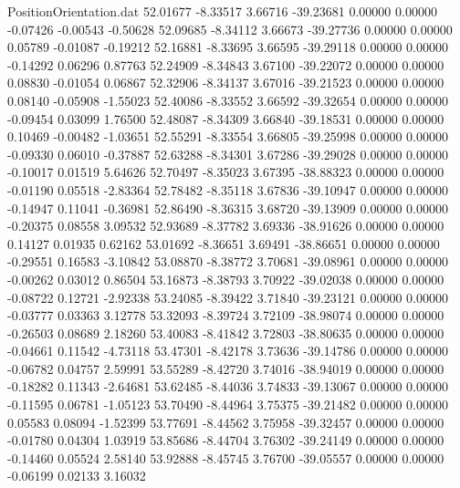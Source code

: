 \begin{filecontents}{PositionOrientation.dat}
  52.01677   -8.33517    3.66716   -39.23681    0.00000    0.00000   -0.07426   -0.00543   -0.50628
  52.09685   -8.34112    3.66673   -39.27736    0.00000    0.00000    0.05789   -0.01087   -0.19212
  52.16881   -8.33695    3.66595   -39.29118    0.00000    0.00000   -0.14292    0.06296    0.87763
  52.24909   -8.34843    3.67100   -39.22072    0.00000    0.00000    0.08830   -0.01054    0.06867
  52.32906   -8.34137    3.67016   -39.21523    0.00000    0.00000    0.08140   -0.05908   -1.55023
  52.40086   -8.33552    3.66592   -39.32654    0.00000    0.00000   -0.09454    0.03099    1.76500
  52.48087   -8.34309    3.66840   -39.18531    0.00000    0.00000    0.10469   -0.00482   -1.03651
  52.55291   -8.33554    3.66805   -39.25998    0.00000    0.00000   -0.09330    0.06010   -0.37887
  52.63288   -8.34301    3.67286   -39.29028    0.00000    0.00000   -0.10017    0.01519    5.64626
  52.70497   -8.35023    3.67395   -38.88323    0.00000    0.00000   -0.01190    0.05518   -2.83364
  52.78482   -8.35118    3.67836   -39.10947    0.00000    0.00000   -0.14947    0.11041   -0.36981
  52.86490   -8.36315    3.68720   -39.13909    0.00000    0.00000   -0.20375    0.08558    3.09532
  52.93689   -8.37782    3.69336   -38.91626    0.00000    0.00000    0.14127    0.01935    0.62162
  53.01692   -8.36651    3.69491   -38.86651    0.00000    0.00000   -0.29551    0.16583   -3.10842
  53.08870   -8.38772    3.70681   -39.08961    0.00000    0.00000   -0.00262    0.03012    0.86504
  53.16873   -8.38793    3.70922   -39.02038    0.00000    0.00000   -0.08722    0.12721   -2.92338
  53.24085   -8.39422    3.71840   -39.23121    0.00000    0.00000   -0.03777    0.03363    3.12778
  53.32093   -8.39724    3.72109   -38.98074    0.00000    0.00000   -0.26503    0.08689    2.18260
  53.40083   -8.41842    3.72803   -38.80635    0.00000    0.00000   -0.04661    0.11542   -4.73118
  53.47301   -8.42178    3.73636   -39.14786    0.00000    0.00000   -0.06782    0.04757    2.59991
  53.55289   -8.42720    3.74016   -38.94019    0.00000    0.00000   -0.18282    0.11343   -2.64681
  53.62485   -8.44036    3.74833   -39.13067    0.00000    0.00000   -0.11595    0.06781   -1.05123
  53.70490   -8.44964    3.75375   -39.21482    0.00000    0.00000    0.05583    0.08094   -1.52399
  53.77691   -8.44562    3.75958   -39.32457    0.00000    0.00000   -0.01780    0.04304    1.03919
  53.85686   -8.44704    3.76302   -39.24149    0.00000    0.00000   -0.14460    0.05524    2.58140
  53.92888   -8.45745    3.76700   -39.05557    0.00000    0.00000   -0.06199    0.02133    3.16032

\end{filecontents}
